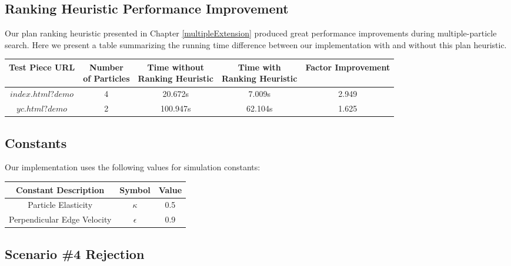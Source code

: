   \subsection{Ranking Heuristic Performance Improvement}

Our plan ranking heuristic presented in Chapter \ref{multipleExtension} produced great performance improvements during multiple-particle search. Here we present a table summarizing the running time difference between our implementation with and without this plan heuristic.

\begin{table}[H]\label{rankingHeuristicResults}
\centering
\def\arraystretch{1.5}
\begin{tabular}{|c|c|c|c|c|}
\hline
Test Piece URL & \specialcell{ Number \\ of Particles} & \specialcell{Time without \\ Ranking Heuristic} & \specialcell{Time with \\ Ranking Heuristic} & Factor Improvement \\ \hline
$index.html?demo$ & 4 & 20.672s & 7.009s & 2.949 \\ \hline
$yc.html?demo$ & 2 & 100.947s & 62.104s & 1.625 \\ \hline
\end{tabular}
\end{table}

  \subsection{Constants}

Our implementation uses the following values for simulation constants:

\begin{table}[H]\label{constantsTable}
\centering
\def\arraystretch{1.1}
\begin{tabular}{|c|c|c|}
\hline
Constant Description & Symbol & Value \\ \hline
Particle Elasticity & $\kappa$ & 0.5 \\
Perpendicular Edge Velocity & $\epsilon$ & 0.9\\ \hline
\end{tabular}
\end{table}


  \subsection{Scenario \#4 Rejection}

